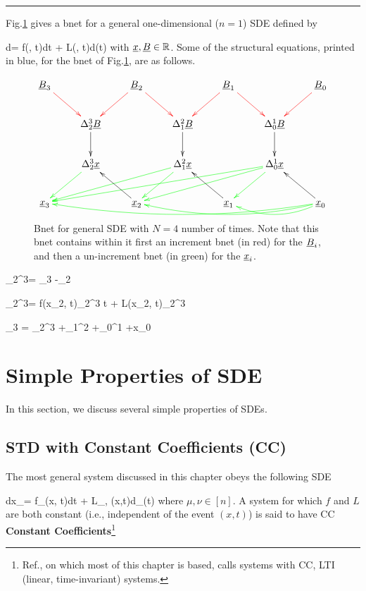 \hrule {}

Fig.\ref{fig-sde-3-nodes} gives a bnet for a
general one-dimensional ($n=1$) SDE defined by


\beq
d\rvx= f(\rvx, t)dt + L(\rvx, t)d\rvB(t)
\eeq
with $\rvx, \rvB\in \RR$.
Some of the structural equations, printed in blue,
for the bnet of Fig.\ref{fig-sde-3-nodes}, are
as follows.

\begin{figure}
$$
\xymatrix{
\rvB_3\ar@[red][dr]
&& \rvB_2\ar@[red][dl]\ar@[red][dr]
&& \rvB_1\ar@[red][dl]\ar@[red][dr]
&& \rvB_0\ar@[red][dl]
\\
&\Delta^3_2\rvB \ar[d]
&&\Delta^2_1 \rvB \ar[d]
&&\Delta^1_0 \rvB \ar[d]
&
\\
&\Delta^3_2\rvx \ar@[green][dl]
&&\Delta^2_1 \rvx \ar@[green][dlll]\ar@[green][dl]
&&\Delta^1_0\rvx \ar@[green][dlllll]\ar@[green][dlll]\ar@[green][dl]
&
\\
\rvx_3
&& \rvx_2 \ar[lu]
&& \rvx_1 \ar[lu]
&& \rvx_0\ar[lu]
\ar@[green]@[green]@/^1pc/[ll]
\ar@[green]@/^1pc/[llll]
\ar@[green]@/^1pc/[llllll]
}
$$
\caption{Bnet for general SDE with $N=4$ number of times. Note that this bnet
contains within it first an increment bnet
(in red) for the $\rvB_i$,
and
then a un-increment bnet (in green)
for the $\rvx_i$.}
\label{fig-sde-3-nodes}
\end{figure}




\beq
\color{blue}
\Delta_{2}^{3}\rvB =
\rvB_3 -\rvB_2
\eeq

\beq
\color{blue}
\Delta_{2}^{3}\rvx =
f(x_2, t)\Delta_2^3 t +
L(x_2, t)\Delta_{2}^{3}\rvB
\eeq

\beq\color{blue}
\rvx_3 = \Delta_{2}^{3}\rvx
+\Delta_{1}^{2}\rvx
+\Delta_{0}^{1}\rvx
+x_0
\eeq





\section{Simple Properties of SDE}
In this section,
we discuss several simple properties
of SDEs.

\subsection{STD with Constant Coefficients (CC)}
The most general system discussed in this
chapter obeys the following SDE

\beq
dx_\mu =
f_\mu(x, t)dt + L_{\mu, \nu}(x,t)d\rvB_\nu(t)
\eeq
where $\mu, \nu\in [n]$.
A system for which $f$ and $L$ are
both constant (i.e., independent of the event $(x,t)$) is said to have CC {\bf Constant Coefficients}\footnote{Ref.\cite{sar-sol},
on which most of this chapter is
based, calls systems with CC, LTI (linear, time-invariant) systems.}



